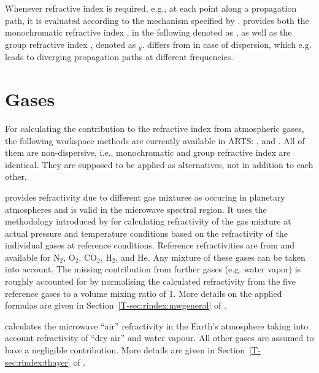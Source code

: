 Whenever refractive index is required, e.g., at each point along a propagation
path, it is evaluated according to the mechanism specified by
. 
provides both the monochromatic refractive index ,
in the following denoted as \Rfr, as well as the group refractive index
, denoted as \Rfr$_{g}$.
 differs from 
in case of dispersion, which e.g. leads to diverging
propagation paths at different frequencies.


\section{Gases}
%
For calculating the contribution to the refractive index from atmospheric
gases, the following workspace methods are currently available in ARTS:
,  and
. All of them are non-dispersive, i.e.,
monochromatic and group refractive index are identical. They are supposed to be
applied as alternatives, not in addition to each other.

 provides refractivity due to different gas
mixtures as occuring in planetary atmospheres and is valid in the microwave
spectral region. It uses the methodology introduced by
\citet{newell65:_absolute_jap} for calculating refractivity of the gas mixture
at actual pressure and temperature conditions based on the refractivity of the
individual gases at reference conditions. Reference refractivities are from
\citet{newell65:_absolute_jap} and available for N$_2$, O$_2$, CO$_2$, H$_2$,
and He. Any mixture of these gases can be taken into account. The missing
contribution from further gases (e.g. water vapor) is roughly accounted for by
normalising the calculated refractivity from the five reference gases to a
volume mixing ratio of 1. More details on the applied formulas are given in
Section~\ref{T-sec:rindex:mwgeneral} of \theory.

 calculates the microwave ``air''
refractivity in the Earth's atmosphere taking into account refractivity of
``dry air'' and water vapour. All other gases are assumed to have a negligible
contribution. More details are given in Section~\ref{T-sec:rindex:thayer} of
\theory.

